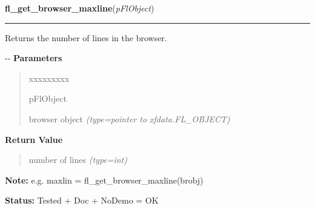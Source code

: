 \hspace{.8\funcindent}\begin{boxedminipage}{\funcwidth}

    \raggedright \textbf{fl\_get\_browser\_maxline}(\textit{pFlObject})

    \vspace{-1.5ex}

    \rule{\textwidth}{0.5\fboxrule}
\setlength{\parskip}{2ex}

Returns the number of lines in the browser.

-{}-
\setlength{\parskip}{1ex}
      \textbf{Parameters}
      \vspace{-1ex}

      \begin{quote}
        \begin{Ventry}{xxxxxxxxx}

          \item[pFlObject]


browser object
            {\it (type=pointer to xfdata.FL\_OBJECT)}

        \end{Ventry}

      \end{quote}

      \textbf{Return Value}
    \vspace{-1ex}

      \begin{quote}

number of lines
      {\it (type=int)}

      \end{quote}

\textbf{Note:} 
e.g. maxlin = fl\_get\_browser\_maxline(brobj)


\textbf{Status:} 
Tested + Doc + NoDemo = OK


    \end{boxedminipage}

    \label{xformslib:flbrowser:fl_get_browser_screenlines}

    \vspace{0.5ex}

